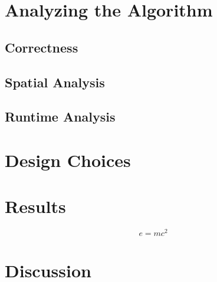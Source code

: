 \documentclass[twoside]{article}
\begin{document}
\begin{multicols}{2}
\lipsum[4] %


\section{Analyzing the Algorithm}

\lipsum[1]

\subsection{Correctness}

\lipsum[2-3]

\subsection{Spatial Analysis}

\lipsum[2-3]

\subsection{Runtime Analysis}

\lipsum[2-3]


\section{Design Choices}

\lipsum[1]


\section{Results}


\lipsum[5] %

\begin{equation}
\label{eq:emc}
e = mc^2
\end{equation}

\lipsum[6] %


\section{Discussion}

\lipsum[7] %


\end{multicols}
\end{document}
